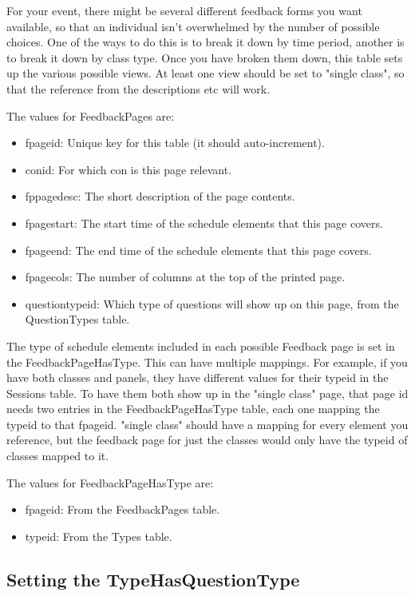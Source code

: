 \documentclass[captions=tablesignature]{scrartcl}
\begin{document}
For your event, there might be several different feedback forms you
want available, so that an individual isn't overwhelmed by the
number of possible choices.  One of the ways to do this is to break
it down by time period, another is to break it down by class type.
Once you have broken them down, this table sets up the various
possible views.  At least one view should be set to "single class",
so that the reference from the descriptions etc will work.

The values for FeedbackPages are:
\begin{itemize}
\item fpageid: Unique key for this table (it should auto-increment).
\item conid: For which con is this page relevant.
\item fppagedesc: The short description of the page contents.
\item fpagestart: The start time of the schedule elements that this
page covers.
\item fpageend: The end time of the schedule elements that this page
covers.
\item fpagecols: The number of columns at the top of the printed page.
\item questiontypeid: Which type of questions will show up on this
page, from the QuestionTypes table.
\end{itemize}

The type of schedule elements included in each possible Feedback
page is set in the FeedbackPageHasType.  This can have multiple
mappings.  For example, if you have both classes and panels, they
have different values for their typeid in the Sessions table.  To
have them both show up in the "single class" page, that page id
needs two entries in the FeedbackPageHasType table, each one
mapping the typeid to that fpageid.  "single class" should have a
mapping for every element you reference, but the feedback page for
just the classes would only have the typeid of classes mapped to
it.

The values for FeedbackPageHasType are:
\begin{itemize}
\item fpageid: From the FeedbackPages table.
\item typeid: From the Types table.
\end{itemize}

\subsection{Setting the TypeHasQuestionType}
\label{sec-15-3}
\end{document}
